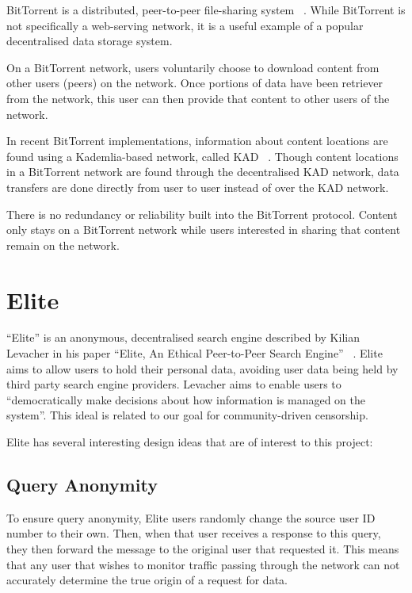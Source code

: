 BitTorrent is a distributed, peer-to-peer file-sharing system ~\cite{torrent}. While BitTorrent is not specifically a
web-serving network, it is a useful example of a popular decentralised data storage system.

On a BitTorrent network, users voluntarily choose to download content from other users (peers) on the network.
Once portions of data have been retriever from the network, this user can then provide that content to other
users of the network.

In recent BitTorrent implementations, information about content locations are found using a Kademlia-based network,
called KAD ~\cite{torrentkad}. Though content locations in a BitTorrent network are found through the decentralised
KAD network, data transfers are done directly from user to user instead of over the KAD network.

There is no redundancy or reliability built into the BitTorrent protocol. Content only stays on a BitTorrent network while
users interested in sharing that content remain on the network.

\section{Elite}

``Elite'' is an anonymous, decentralised search engine described by Kilian Levacher in his paper
``Elite, An Ethical Peer-to-Peer Search Engine'' ~\cite{levacher}. Elite aims to allow users to hold their
personal data, avoiding user data being held by third party search engine providers.
Levacher aims to enable users to ``democratically make decisions about how information is managed on the system''.
This ideal is related to our goal for community-driven censorship.

Elite has several interesting design ideas that are of interest to this project:

\subsection{Query Anonymity}

To ensure query anonymity, Elite users randomly change the source user ID number to their own. Then, when that user
receives a response to this query, they then forward the message to the original user that requested it. This means
that any user that wishes to monitor traffic passing through the network can not accurately determine the true
origin of a request for data.


